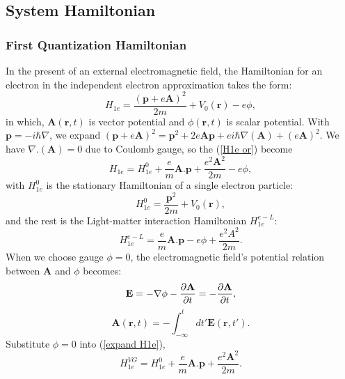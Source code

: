 \documentclass[12pt,english,a4paper]{article}
\begin{document}
	\subsection{System Hamiltonian}
	\subsubsection{First Quantization Hamiltonian}
	\quad In the present of an external electromagnetic field, the Hamiltonian for an electron in the independent electron approximation takes the form:
	\begin{equation}
		\label{H1e or}
		H_{1e} = \frac{(\textbf{p} + e \textbf{A})^2}{2m} + V_0(\textbf{r}) -e\phi,
	\end{equation}
	in which, $\textbf{A}(\textbf{r},t)$ is vector potential and $\phi(\textbf{r},t)$ is scalar potential. With $\textbf{p} = - i\hbar\nabla$, we expand $(\textbf{p}+e\textbf{A})^2 = \textbf{p}^2 + 2e\textbf{A}\textbf{p} + ei \hbar \nabla(\textbf{A}) + (e\textbf{A})^2$. We have $\nabla.(\textbf{A}) = 0$ due to Coulomb gauge, so the (\ref{H1e or}) become
	\begin{equation}
		\label{expand H1e}
		H_{1e} = H^0_{1e} + \frac{e}{m} \textbf{A}.\textbf{p} + \frac{e^2 \textbf{A}^2}{2m} - e\phi,
	\end{equation}
	\quad with $H^0_{1e}$ is the stationary Hamiltonian of a single electron particle:
	\begin{equation}
		\label{H01e}
		H_{1e}^0 = \frac{\textbf{p}^2}{2m} + V_0(\textbf{r}),
	\end{equation}
	and the rest is the Light-matter interaction Hamiltonian $H^{e-L}_{1e}$:
	\begin{equation}
		\label{org LMIH}
		H^{e-L}_{1e} =\frac{e}{m} \textbf{A}.\textbf{p} - e\phi + \frac{e^2 A^2}{2m}.
	\end{equation}
	\quad When we choose gauge $\phi = 0$, the electromagnetic field's potential relation between $\textbf{A}$ and $\phi$ becomes:
	\begin{equation}
		\textbf{E} = - \nabla \phi - \pdv{\textbf{A}}{t} = - \pdv{\textbf{A}}{t},
	\end{equation}
	\begin{equation}
		\textbf{A}(\textbf{r},t) = -\int_{-\infty}^t dt' \textbf{E}(\textbf{r}, t'). 
	\end{equation}
\quad Substitute $\phi = 0$ into (\ref{expand H1e}),
	\begin{equation}
		H^{VG}_{1e}= H^0_{1e} + \frac{e}{m}\textbf{A}.\textbf{p} + \frac{e^2\textbf{A}^2}{2m}.
	\end{equation}
\end{document}
